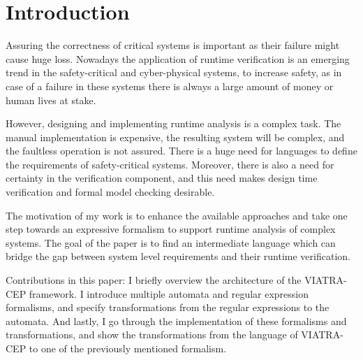 \chapter{Introduction}
\label{chap:intro}

Assuring the correctness of critical systems is important as their failure might cause huge loss.
Nowadays the application of runtime verification is an emerging trend in the safety-critical and cyber-physical systems, to increase safety, as in case of a failure in these systems there is always a large amount of money or human lives at stake. 

However, designing and implementing runtime analysis is a complex task. The manual implementation is expensive, the resulting system will be complex, and the faultless operation is not assured.
There is a huge need for languages to define the requirements of safety-critical systems.
Moreover, there is also a need for certainty in the verification component, and this need makes design time verification and formal model checking desirable. 

The motivation of my work is to enhance the available approaches and take one step towards an expressive formalism to support runtime analysis of complex systems.
The goal of the paper is to find an intermediate language which can bridge the gap between system level requirements and their runtime verification.

Contributions in this paper: 
I briefly overview the architecture of the VIATRA-CEP framework.
I introduce multiple automata and regular expression formalisms, and specify transformations from the regular expressions to the automata. 
And lastly, I go through the implementation of these formalisms and transformations, and show the transformations from the language of VIATRA-CEP to one of the previously mentioned formalism.